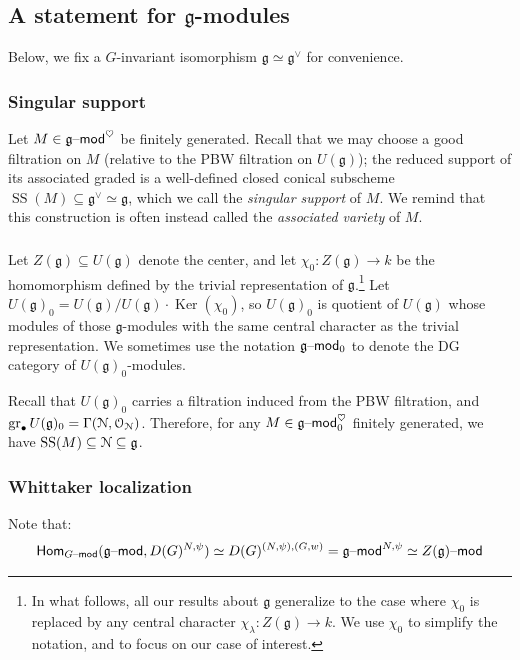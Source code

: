 \documentclass[reqno,11pt]{amsart}
\numberwithin{equation}{subsection}
\theoremstyle{remark}
\newcommand{\sN}{{\EuScript N}}
\newcommand{\sO}{{\EuScript O}}
\newcommand{\fg}{{\mathfrak g}}
\newcommand{\on}{\operatorname}
\newcommand{\mathendash}{\text{\textendash}}
\newcommand{\Ker}{\on{Ker}}
\newcommand{\gr}{\on{gr}}
\renewcommand{\dot}{\bullet}
\renewcommand{\mod}{\mathendash\mathsf{mod}}
\newcommand{\TwoHom}{\mathsf{Hom}}
\newcommand{\heart}{\heartsuit}
\renewcommand{\subset}{\subseteq}
\renewcommand{\SS}{\on{SS}}
\begin{document}
\subsection{A statement for $\fg$-modules}

Below, we fix a $G$-invariant isomorphism $\fg \simeq \fg^{\vee}$
for convenience. 

\subsubsection{Singular support}

Let $M \in \fg\mod^{\heart}$ be finitely generated.
Recall that we may choose a good filtration on $M$
(relative to the PBW filtration on $U(\fg)$);
the reduced support of its associated graded is 
a well-defined closed conical subscheme 
$\SS(M) \subset \fg^{\vee} \simeq \fg$,
which we call the \emph{singular support} of $M$. 
We remind that this construction is often instead called the
\emph{associated variety} of $M$.

\subsubsection{}

Let $Z(\fg) \subset U(\fg)$ denote the center, 
and let $\chi_0:Z(\fg) \to k$ be the homomorphism defined
by the trivial representation of $\fg$.\footnote{In what follows,
all our results about $\fg$ generalize to the case where
$\chi_0$ is replaced by any central character 
$\chi_{\lambda}:Z(\fg) \to k$. We use $\chi_0$ to simplify the
notation, and to focus on our case of interest.}
Let $U(\fg)_0 = U(\fg)/U(\fg) \cdot \Ker(\chi_0)$,
so $U(\fg)_0$ is quotient of $U(\fg)$ whose modules
of those $\fg$-modules with the same central character as the trivial 
representation. We sometimes use the notation $\fg\mod_0$ to denote
the DG category of $U(\fg)_0$-modules.

Recall that $U(\fg)_0$ carries a filtration induced from
the PBW filtration, and $\gr_{\dot} U(\fg)_0 = \Gamma(\sN,\sO_{\sN})$.
Therefore, for any $M \in \fg\mod_0^{\heart}$ finitely 
generated, we have $\SS(M) \subset \sN \subset \fg$.

\subsubsection{Whittaker localization}\label{sss:whit-loc}

Note that:
%
\[
\TwoHom_{G\mod}(\fg\mod,D(G)^{N,\psi}) \simeq D(G)^{(N,\psi),(G,w)}
= \fg\mod^{N,\psi} \simeq Z(\fg)\mod
\]
\end{document}
